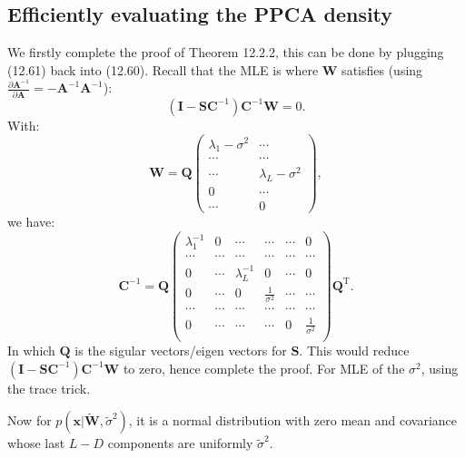 \documentclass[UTF8]{ctexart}
\begin{document}
\subsection{Efficiently evaluating the PPCA density}
We firstly complete the proof of Theorem 12.2.2, this can be done by plugging (12.61) back into (12.60).
Recall that the MLE is where $\textbf{W}$ satisfies (using $\frac{\partial \textbf{A}^{-1}}{\partial \textbf{A}}=-\textbf{A}^{-1}\textbf{A}^{-1}$):
$$(\textbf{I}-\textbf{S}\textbf{C}^{-1})\textbf{C}^{-1}\textbf{W}=0.$$
With:
$$\textbf{W}=\textbf{Q}
\begin{pmatrix}
\lambda_{1}-\sigma^{2} & \cdots\\
\cdots & \cdots\\
\cdots & \lambda_{L}-\sigma^{2} \\
0 & \cdots \\
\cdots & 0
\end{pmatrix},
$$
we have:
$$\textbf{C}^{-1}=\textbf{Q}
\begin{pmatrix}
\lambda^{-1}_{1} & 0 & \cdots & \cdots & \cdots & 0\\
\cdots & \cdots & \cdots & \cdots & \cdots & \cdots\\
0 & \cdots & \lambda^{-1}_{L} & 0 & \cdots & 0\\
0 & \cdots & 0 & \frac{1}{\sigma^{2}} & \cdots & \cdots\\
\cdots & \cdots & \cdots & \cdots & \cdots & \cdots\\
0 & \cdots & \cdots & \cdots & 0 & \frac{1}{\sigma^{2}}\\
\end{pmatrix}
\textbf{Q}^{\text{T}}.$$
In which $\textbf{Q}$ is the sigular vectors/eigen vectors for $\textbf{S}$.
This would reduce $(\textbf{I}-\textbf{S}\textbf{C}^{-1})\textbf{C}^{-1}\textbf{W}$ to zero, hence complete the proof.
For MLE of the $\sigma^{2}$, using the trace trick.

Now for $p(\textbf{x}|\tilde{\textbf{W}},\tilde{\sigma}^{2})$, it is a normal distribution with zero mean and covariance whose last $L-D$ components are uniformly $\tilde{\sigma}^{2}$.
\end{document}
